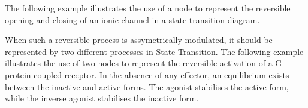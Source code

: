 \begin{center}
\end{center}

The following example illustrates the use of a  node to represent the reversible opening and closing of an ionic channel in a state transition diagram.

\begin{center}
\end{center}

When such a reversible process is assymetrically modulated, it should be represented by two different processes in State Transition. The following example illustrates the use of two  nodes to represent the reversible activation of a G-protein coupled receptor. In the absence of any effector, an equilibrium exists between the inactive and active forms. The agonist stabilises the active form, while the inverse agonist stabilises the inactive form.

